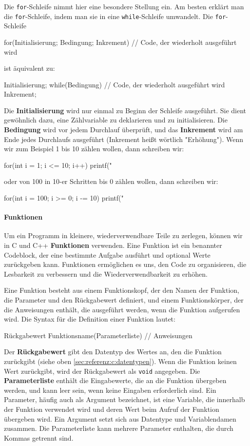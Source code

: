 Die \texttt{for}-Schleife nimmt hier eine besondere Stellung ein. Am besten erklärt man die \texttt{for}-Schleife, indem man sie in eine \texttt{while}-Schleife umwandelt. Die \texttt{for}-Schleife
\begin{code}
for(Initialisierung; Bedingung; Inkrement) {
    // Code, der wiederholt ausgeführt wird
}
\end{code}
ist äquivalent zu:
\begin{code}
{
    Initialisierung;
    while(Bedingung) {
        // Code, der wiederholt ausgeführt wird
        Inkrement;
    }
}
\end{code}
Die \textbf{Initialisierung} wird nur einmal zu Beginn der Schleife ausgeführt. Sie dient gewöhnlich dazu, eine Zählvariable zu deklarieren und zu initialisieren. Die \textbf{Bedingung} wird vor jedem Durchlauf überprüft, und das \textbf{Inkrement} wird am Ende jedes Durchlaufs ausgeführt (Inkrement heißt wörtlich "Erhöhung"). Wenn wir zum Beispiel 1 bis 10 zählen wollen, dann schreiben wir:
\begin{code}
for(int i = 1; i <= 10; i++) {
    printf("%
}
\end{code}
oder von 100 in 10-er Schritten bis 0 zählen wollen, dann schreiben wir:
\begin{code}
for(int i = 100; i >= 0; i -= 10) {
    printf("%
}       
\end{code}

\paragraph{Funktionen}

Um ein Programm in kleinere, wiederverwendbare Teile zu zerlegen, können wir in C und C++ \textbf{Funktionen} verwenden. Eine Funktion ist ein benannter Codeblock, der eine bestimmte Aufgabe ausführt und optional Werte zurückgeben kann. Funktionen ermöglichen es uns, den Code zu organisieren, die Lesbarkeit zu verbessern und die Wiederverwendbarkeit zu erhöhen.

Eine Funktion besteht aus einem Funktionskopf, der den Namen der Funktion, die Parameter und den Rückgabewert definiert, und einem Funktionskörper, der die Anweisungen enthält, die ausgeführt werden, wenn die Funktion aufgerufen wird. Die Syntax für die Definition einer Funktion lautet:
\begin{code}
Rückgabewert Funktionsname(Parameterliste) {
    // Anweisungen
}
\end{code}
Der \textbf{Rückgabewert} gibt den Datentyp des Wertes an, den die Funktion zurückgibt (siehe oben \ref{sec:referenz:c:datentypen}). Wenn die Funktion keinen Wert zurückgibt, wird der Rückgabewert als \texttt{void} angegeben. Die \textbf{Parameterliste} enthält die Eingabewerte, die an die Funktion übergeben werden, und kann leer sein, wenn keine Eingaben erforderlich sind. Ein Parameter, häufig auch als Argument bezeichnet, ist eine Variable, die innerhalb der Funktion verwendet wird und deren Wert beim Aufruf der Funktion übergeben wird. Ein Argument setzt sich aus Datentype und Variablendamen zusammen. Die Parameterliste kann mehrere Parameter enthalten, die durch Kommas getrennt sind.

